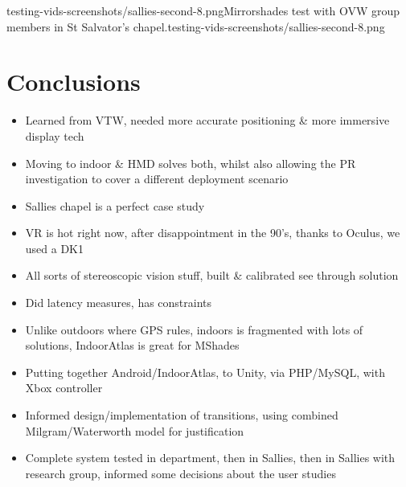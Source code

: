        {testing-vids-screenshots/sallies-second-8.png}{Mirrorshades test with OVW group members in St Salvator's chapel.}{testing-vids-screenshots/sallies-second-8.png}


\section{Conclusions}
\begin{itemize}
	\item Learned from VTW, needed more accurate positioning \& more immersive display tech
	\item Moving to indoor \& HMD solves both, whilst also allowing the PR investigation to cover a different deployment scenario
	\item Sallies chapel is a perfect case study
	\item VR is hot right now, after disappointment in the 90's, thanks to Oculus, we used a DK1
	\item All sorts of stereoscopic vision stuff, built \& calibrated see through solution
	\item Did latency measures, has constraints
	\item Unlike outdoors where GPS rules, indoors is fragmented with lots of solutions, IndoorAtlas is great for MShades
	\item Putting together Android/IndoorAtlas, to Unity, via PHP/MySQL, with Xbox controller
	\item Informed design/implementation of transitions, using combined Milgram/Waterworth model for justification
	\item Complete system tested in department, then in Sallies, then in Sallies with research group, informed some decisions about the user studies
\end{itemize}

